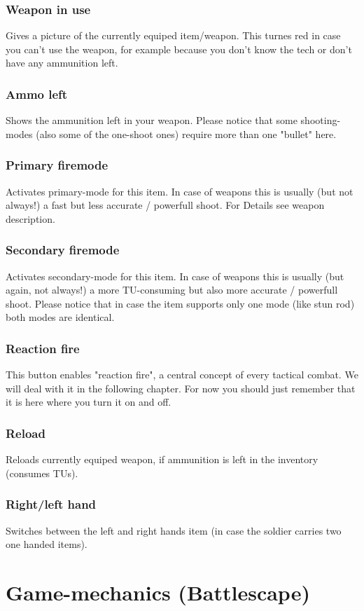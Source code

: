 \subsubsection{Weapon in use}
Gives a picture of the currently equiped item/weapon. This turnes red in case you can't use the weapon, for example because you don't know the tech or don't have any ammunition left.
\subsubsection{Ammo left}
Shows the ammunition left in your weapon. Please notice that some shooting-modes (also some of the one-shoot ones) require more than one "bullet" here.
\subsubsection{Primary firemode}
Activates primary-mode for this item. In case of weapons this is usually (but not always!) a fast but less accurate / powerfull shoot. For Details see weapon description.
\subsubsection{Secondary firemode}
Activates secondary-mode for this item. In case of weapons this is usually (but again, not always!) a more TU-consuming but also more accurate / powerfull shoot. Please notice that in case the item supports only one mode (like stun rod) both modes are identical.
\subsubsection{Reaction fire}
This button enables "reaction fire", a central concept of every tactical combat. We will deal with it in the following chapter. For now you should just remember that it is here where you turn it on and off.
\subsubsection{Reload}
Reloads currently equiped weapon, if ammunition is left in the inventory (consumes TUs).
\subsubsection{Right/left hand}
Switches between the left and right hands item (in case the soldier carries two one handed items).


\section{Game-mechanics (Battlescape)}

